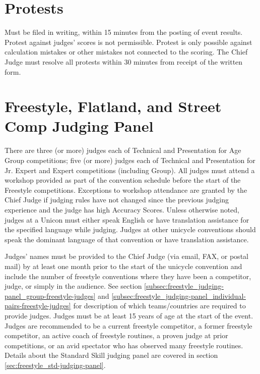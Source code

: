 \section{Protests}
Must be filed in writing, within 15 minutes from the posting of event results.
Protest against judges' scores is not permissible.
Protest is only possible against calculation mistakes or other mistakes not connected to the scoring.
The Chief Judge must resolve all protests within 30 minutes from receipt of the written form.

\section{Freestyle, Flatland, and Street Comp Judging Panel \label{sec:freestyle_judging-panel}}
There are three (or more) judges each of Technical and Presentation for Age Group competitions; five (or more) judges each of Technical and Presentation for Jr. Expert and Expert competitions (including Group).
All judges must attend a workshop provided as part of the convention schedule before the start of the Freestyle competitions.
Exceptions to workshop attendance are granted by the Chief Judge if judging rules have not changed since the previous judging experience and the judge has high Accuracy Scores.
Unless otherwise noted, judges at a Unicon must either speak English or have translation assistance for the specified language while judging.
Judges at other unicycle conventions should speak the dominant language of that convention or have translation assistance.

Judges' names must be provided to the Chief Judge (via email, FAX, or postal mail) by at least one month prior to the start of the unicycle convention and include the number of freestyle conventions where they have been a competitor, judge, or simply in the audience.
See section \ref{subsec:freestyle_judging-panel_group-freestyle-judges} and \ref{subsec:freestyle_judging-panel_individual-pairs-freestyle-judges} for description of which teams/countries are required to provide judges.
Judges must be at least 15 years of age at the start of the event.
Judges are recommended to be a current freestyle competitor, a former freestyle competitor, an active coach of freestyle routines, a proven judge at prior competitions, or an avid spectator who has observed many freestyle routines.
Details about the Standard Skill judging panel are covered in section \ref{sec:freestyle_std-judging-panel}.

